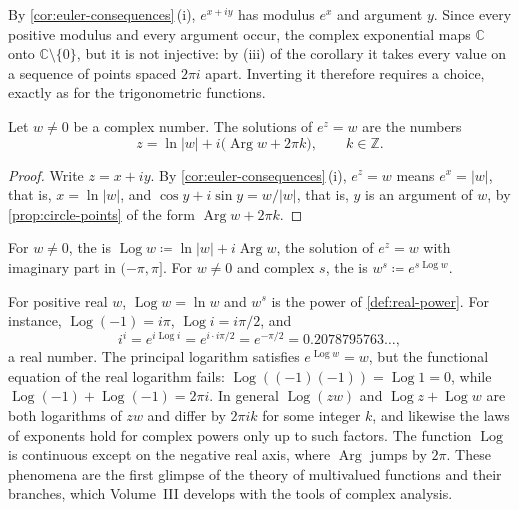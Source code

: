 By \cref{cor:euler-consequences}\,(i), $e^{x+iy}$ has modulus $e^x$ and argument $y$. Since every positive modulus and every argument occur, the complex exponential maps $\mathbb C$ onto $\mathbb C\setminus\{0\}$, but it is not injective: by (iii) of the corollary it takes every value on a sequence of points spaced $2\pi i$ apart. Inverting it therefore requires a choice, exactly as for the trigonometric functions.

\begin{proposition}
\label{prop:complex-log}
Let $w\ne0$ be a complex number. The solutions of $e^z=w$ are the numbers
\[
z=\ln|w|+i\bigl(\operatorname{Arg}w+2\pi k\bigr),\qquad k\in\mathbb Z .
\]
\end{proposition}

\begin{proof}
Write $z=x+iy$. By \cref{cor:euler-consequences}\,(i), $e^z=w$ means $e^x=|w|$, that is, $x=\ln|w|$, and $\cos y+i\sin y=w/|w|$, that is, $y$ is an argument of $w$, by \cref{prop:circle-points} of the form $\operatorname{Arg}w+2\pi k$.
\end{proof}

\begin{definition}
\label{def:complex-log}
For $w\ne0$, the  is $\operatorname{Log}w\coloneqq\ln|w|+i\operatorname{Arg}w$, the solution of $e^z=w$ with imaginary part in $(-\pi,\pi]$. For $w\ne0$ and complex $s$, the  is $w^s\coloneqq e^{s\operatorname{Log}w}$.
\end{definition}

For positive real $w$, $\operatorname{Log}w=\ln w$ and $w^s$ is the power of \cref{def:real-power}. For instance, $\operatorname{Log}(-1)=i\pi$, $\operatorname{Log}i=i\pi/2$, and
\[
i^i=e^{i\operatorname{Log}i}=e^{i\cdot i\pi/2}=e^{-\pi/2}=0.2078795763\ldots,
\]
a real number. The principal logarithm satisfies $e^{\operatorname{Log}w}=w$, but the functional equation of the real logarithm fails: $\operatorname{Log}((-1)(-1))=\operatorname{Log}1=0$, while $\operatorname{Log}(-1)+\operatorname{Log}(-1)=2\pi i$. In general $\operatorname{Log}(zw)$ and $\operatorname{Log}z+\operatorname{Log}w$ are both logarithms of $zw$ and differ by $2\pi ik$ for some integer $k$, and likewise the laws of exponents hold for complex powers only up to such factors. The function $\operatorname{Log}$ is continuous except on the negative real axis, where $\operatorname{Arg}$ jumps by $2\pi$. These phenomena are the first glimpse of the theory of multivalued functions and their branches, which Volume~III develops with the tools of complex analysis.

